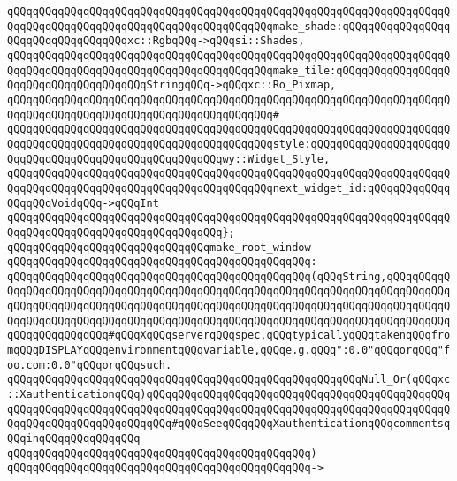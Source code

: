 \verb|qQQqqQQqqQQqqQQqqQQqqQQqqQQqqQQqqQQqqQQqqQQqqQQqqQQqqQQqqQQqqQQqqQQqqQQqqQQqqQQqqQQqqQQqqQQqqQQqqQQqqQQqqQQqqQQqmake_shade:qQQqqQQqqQQqqQQqqQQqqQQqqQQqqQQqqQQqxc::RgbqQQq->qQQqsi::Shades,|\newline
\verb|qQQqqQQqqQQqqQQqqQQqqQQqqQQqqQQqqQQqqQQqqQQqqQQqqQQqqQQqqQQqqQQqqQQqqQQqqQQqqQQqqQQqqQQqqQQqqQQqqQQqqQQqqQQqqQQqmake_tile:qQQqqQQqqQQqqQQqqQQqqQQqqQQqqQQqqQQqqQQqStringqQQq->qQQqxc::Ro_Pixmap,|\newline
\verb|qQQqqQQqqQQqqQQqqQQqqQQqqQQqqQQqqQQqqQQqqQQqqQQqqQQqqQQqqQQqqQQqqQQqqQQqqQQqqQQqqQQqqQQqqQQqqQQqqQQqqQQqqQQqqQQq#|\newline
\verb|qQQqqQQqqQQqqQQqqQQqqQQqqQQqqQQqqQQqqQQqqQQqqQQqqQQqqQQqqQQqqQQqqQQqqQQqqQQqqQQqqQQqqQQqqQQqqQQqqQQqqQQqqQQqqQQqstyle:qQQqqQQqqQQqqQQqqQQqqQQqqQQqqQQqqQQqqQQqqQQqqQQqqQQqqQQqwy::Widget_Style,|\newline
\verb|qQQqqQQqqQQqqQQqqQQqqQQqqQQqqQQqqQQqqQQqqQQqqQQqqQQqqQQqqQQqqQQqqQQqqQQqqQQqqQQqqQQqqQQqqQQqqQQqqQQqqQQqqQQqqQQqnext_widget_id:qQQqqQQqqQQqqQQqqQQqVoidqQQq->qQQqInt|\newline
\verb|qQQqqQQqqQQqqQQqqQQqqQQqqQQqqQQqqQQqqQQqqQQqqQQqqQQqqQQqqQQqqQQqqQQqqQQqqQQqqQQqqQQqqQQqqQQqqQQqqQQqqQQq};|\newline
\newline
\verb|qQQqqQQqqQQqqQQqqQQqqQQqqQQqqQQqmake_root_window|\newline
\verb|qQQqqQQqqQQqqQQqqQQqqQQqqQQqqQQqqQQqqQQqqQQqqQQq:|\newline
\verb|qQQqqQQqqQQqqQQqqQQqqQQqqQQqqQQqqQQqqQQqqQQqqQQq(qQQqString,qQQqqQQqqQQqqQQqqQQqqQQqqQQqqQQqqQQqqQQqqQQqqQQqqQQqqQQqqQQqqQQqqQQqqQQqqQQqqQQqqQQqqQQqqQQqqQQqqQQqqQQqqQQqqQQqqQQqqQQqqQQqqQQqqQQqqQQqqQQqqQQqqQQqqQQqqQQqqQQqqQQqqQQqqQQqqQQqqQQqqQQqqQQqqQQqqQQqqQQqqQQqqQQqqQQqqQQqqQQqqQQqqQQqqQQqqQQq#qQQqXqQQqserverqQQqspec,qQQqtypicallyqQQqtakenqQQqfromqQQqDISPLAYqQQqenvironmentqQQqvariable,qQQqe.g.qQQq":0.0"qQQqorqQQq"foo.com:0.0"qQQqorqQQqsuch.|\newline
\verb|qQQqqQQqqQQqqQQqqQQqqQQqqQQqqQQqqQQqqQQqqQQqqQQqqQQqqQQqNull_Or(qQQqxc::XauthenticationqQQq)qQQqqQQqqQQqqQQqqQQqqQQqqQQqqQQqqQQqqQQqqQQqqQQqqQQqqQQqqQQqqQQqqQQqqQQqqQQqqQQqqQQqqQQqqQQqqQQqqQQqqQQqqQQqqQQqqQQqqQQqqQQqqQQqqQQqqQQqqQQqqQQq#qQQqSeeqQQqqQQqXauthenticationqQQqcommentsqQQqinqQQqqQQqqQQqqQQq|\newline
\verb|qQQqqQQqqQQqqQQqqQQqqQQqqQQqqQQqqQQqqQQqqQQqqQQq)|\newline
\verb|qQQqqQQqqQQqqQQqqQQqqQQqqQQqqQQqqQQqqQQqqQQqqQQq->|\newline
